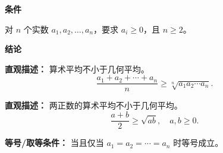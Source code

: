 \begin{statementbox}
	\textbf{\textcolor{CStatement}{条件}}
	\begin{description}[style=nextline, leftmargin=2.8em, labelsep=0.5em, itemsep=0.35em]
		\item[\textbf{\textcolor{CStatement}{条件 1（非负实数）：}}]
			对 $n$ 个实数 $a_1,a_2,\dots,a_n$，要求 $a_i \ge 0$，且 $n \ge 2$。
	\end{description}
	\par
	\textbf{\textcolor{CStatement}{结论}}
	\begin{description}[style=nextline, leftmargin=2.8em, labelsep=0.5em, itemsep=0.45em]
		\item[\textbf{\textcolor{CStatement}{结论一（算术几何不等式）：}}]
			\textbf{\textcolor{CStatement}{直观描述：}}
			算术平均不小于几何平均。
			\[
				\frac{a_1+a_2+\cdots+a_n}{n} \ge \sqrt[n]{a_1a_2\cdots a_n}.
			\]
		\item[\textbf{\textcolor{CStatement}{推广结论（两数特例）：}}]
			\textbf{\textcolor{CStatement}{直观描述：}}
			两正数的算术平均不小于几何平均。
			\[
				\frac{a+b}{2} \ge \sqrt{ab},\quad a,b \ge 0.
			\]
	\end{description}
	\par
	\textbf{\textcolor{CStatement}{等号/取等条件：}}
	当且仅当 $a_1=a_2=\cdots=a_n$ 时等号成立。
\end{statementbox}
